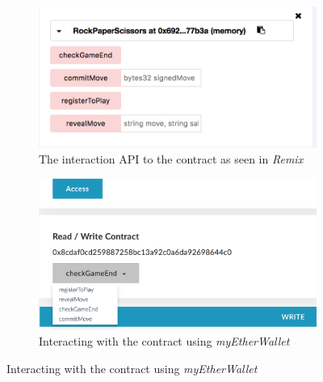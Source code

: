 \documentclass[a4paper, twoside]{article}
\begin{document}
\begin{figure}
	\centering
	\begin{subfigure}{.5\textwidth}
		\centering
		\includegraphics[width=\linewidth]{screens/solidityAPI.png}
		\captionsetup{width=.95\linewidth}
	
		\caption[width=0.8\linewidth]{The interaction API to the contract as seen in \textit{Remix}}
		\label{fig:sub1}
	\end{subfigure}%
	\begin{subfigure}{.5\textwidth}
		\centering
		\includegraphics[width=\linewidth]{screens/ether3}
		      \captionsetup{width=.95\linewidth}
		
		\caption[width=0.8\linewidth]{Interacting with the contract using \textit{myEtherWallet}}
		\label{fig:sub2}
	\end{subfigure}
	\label{fig:test}
\end{figure}
\end{document}
